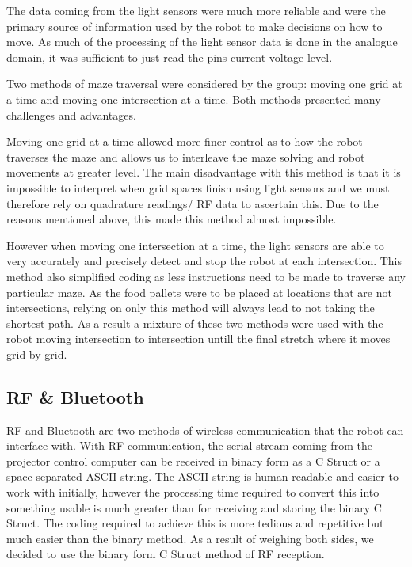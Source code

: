 \documentclass{article}
\begin{document}
The data coming from the light sensors were much more reliable and were the primary source of information used by the robot to make decisions on how to move. As much of the processing of the light sensor data is done in the analogue domain, it was sufficient to just read the pins current voltage level.

Two methods of maze traversal were considered by the group: moving one grid at a time and moving one intersection at a time. Both methods presented many challenges and advantages.

Moving one grid at a time allowed more finer control as to how the robot traverses the maze and allows us to interleave the maze solving and robot movements at greater level. The main disadvantage with this method is that it is impossible to interpret when grid spaces finish using light sensors and we must therefore rely on quadrature readings/ RF data to ascertain this. Due to the reasons mentioned above, this made this method almost impossible.

However when moving one intersection at a time, the light sensors are able to very accurately and precisely detect and stop the robot at each intersection. This method also simplified coding as less instructions need to be made to traverse any particular maze. As the food pallets were to be placed at locations that are not intersections, relying on only this method will always lead to not taking the shortest path. As a result a mixture of these two methods were used with the robot moving intersection to intersection untill the final stretch where it moves grid by grid.

\subsection{RF \& Bluetooth}

RF and Bluetooth are two methods of wireless communication that the robot can interface with. With RF communication, the serial stream coming from the projector control computer can be received in binary form as a C Struct or a space separated ASCII string. The ASCII string is human readable and easier to work with initially, however the processing time required to convert this into something usable is much greater than for receiving and storing the binary C Struct. The coding required to achieve this is more tedious and repetitive but much easier than the binary method. As a result of weighing both sides, we decided to use the binary form C Struct method of RF reception.
\end{document}
